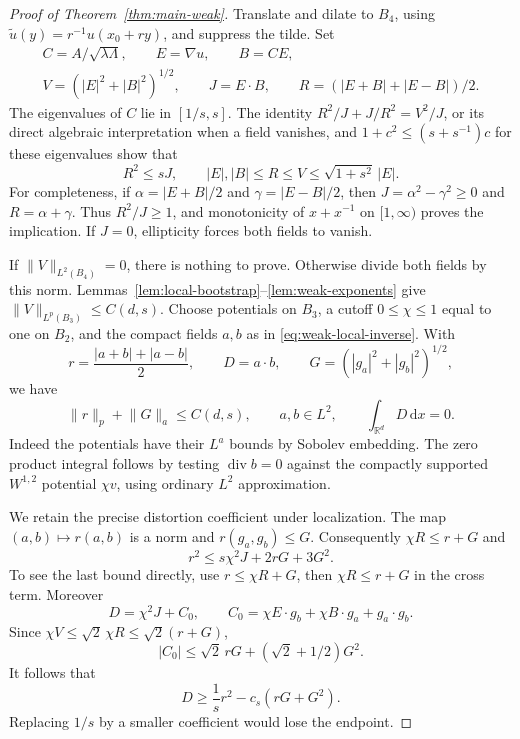 \documentclass[11pt,a4paper]{article}
\numberwithin{equation}{section}
\theoremstyle{definition}
\theoremstyle{remark}\newtheorem{remark}[theorem]{Remark}
\DeclareMathOperator{\diver}{div}
\newcommand{\R}{\mathbb R}
\newcommand{\dd}{\,\mathrm dx}
\newcommand{\norm}[1]{\lVert #1\rVert}
\begin{document}
\begin{proof}[Proof of Theorem~\ref{thm:main-weak}]
Translate and dilate to \(B_4\), using
\(\widetilde u(y)=r^{-1}u(x_0+ry)\), and suppress the tilde.
Set
\[
 \begin{gathered}
 C=A/\sqrt{\lambda\Lambda},\qquad E=\nabla u,\qquad B=CE,\\
 V=(|E|^2+|B|^2)^{1/2},\qquad J=E\cdot B,\qquad
 R=(|E+B|+|E-B|)/2 .
 \end{gathered}
\]
The eigenvalues of \(C\) lie in \([1/s,s]\).
The identity \(R^2/J+J/R^2=V^2/J\), or its direct algebraic
interpretation when a field vanishes, and
\(1+c^2\leq(s+s^{-1})c\) for these eigenvalues show that
\begin{equation}\label{eq:weak-distortion}
 R^2\leq sJ,\qquad |E|,|B|\leq R\leq V
                 \leq\sqrt{1+s^2}\,|E|.
\end{equation}
For completeness, if \(\alpha=|E+B|/2\) and
\(\gamma=|E-B|/2\), then \(J=\alpha^2-\gamma^2\geq0\)
and \(R=\alpha+\gamma\). Thus \(R^2/J\geq1\), and
monotonicity of \(x+x^{-1}\) on \([1,\infty)\) proves the implication.
If \(J=0\), ellipticity forces both fields to vanish.

If \(\norm V_{L^2(B_4)}=0\), there is nothing to prove.
Otherwise divide both fields by this norm.
Lemmas~\ref{lem:local-bootstrap}--\ref{lem:weak-exponents}
give \(\norm V_{L^p(B_3)}\leq C(d,s)\).
Choose potentials on \(B_3\), a cutoff \(0\leq\chi\leq1\)
equal to one on \(B_2\), and the compact fields \(a,b\) as in
\eqref{eq:weak-local-inverse}. With
\[
 r=\frac{|a+b|+|a-b|}{2},\qquad D=a\cdot b,\qquad
 G=(|g_a|^2+|g_b|^2)^{1/2},
\]
we have
\begin{equation}\label{eq:weak-cutoff-norms}
 \norm r_p+\norm G_a\leq C(d,s),\qquad
 a,b\in L^2,\qquad \int_{\R^d}D\dd=0.
\end{equation}
Indeed the potentials have their \(L^a\) bounds by Sobolev
embedding. The zero product integral follows by testing
\(\diver b=0\) against the compactly supported \(W^{1,2}\)
potential \(\chi v\), using ordinary \(L^2\) approximation.

We retain the precise distortion coefficient under localization.
The map \((a,b)\mapsto r(a,b)\) is a norm and
\(r(g_a,g_b)\leq G\). Consequently \(\chi R\leq r+G\) and
\[
 r^2\leq s\chi^2J+2rG+3G^2.
\]
To see the last bound directly, use
\(r\leq\chi R+G\), then \(\chi R\leq r+G\) in the cross term.
Moreover
\[
 D=\chi^2J+C_0,\qquad
 C_0=\chi E\cdot g_b+\chi B\cdot g_a+g_a\cdot g_b .
\]
Since \(\chi V\leq\sqrt2\,\chi R\leq\sqrt2(r+G)\),
\[
 |C_0|\leq\sqrt2\,rG+(\sqrt2+1/2)G^2.
\]
It follows that
\begin{equation}\label{eq:weak-exact-coefficient}
 D\geq\frac1s r^2-c_s(rG+G^2).
\end{equation}
Replacing \(1/s\) by a smaller coefficient would lose the endpoint.


\end{proof}
\end{document}
